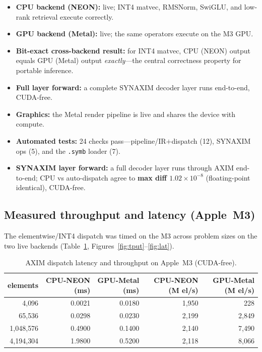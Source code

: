 \documentclass[11pt,a4paper]{article}
\begin{document}
\begin{itemize}[leftmargin=1.4em]
    \item \textbf{CPU backend (NEON):} live; INT4 matvec, RMSNorm, SwiGLU, and low-rank
    retrieval execute correctly.
    \item \textbf{GPU backend (Metal):} live; the same operators execute on the M3 GPU.
    \item \textbf{Bit-exact cross-backend result:} for INT4 matvec, CPU (NEON) output equals
    GPU (Metal) output \emph{exactly}---the central correctness property for portable
    inference.
    \item \textbf{Full layer forward:} a complete SYNAXIM decoder layer runs end-to-end,
    CUDA-free.
    \item \textbf{Graphics:} the Metal render pipeline is live and shares the device with
    compute.
    \item \textbf{Automated tests:} 24 checks pass---pipeline/IR$+$dispatch (12), SYNAXIM
    ops (5), and the \texttt{.symb} loader (7).
    \item \textbf{SYNAXIM layer forward:} a full decoder layer runs through AXIM
    end-to-end; CPU vs auto-dispatch agree to \textbf{max diff $1.02\times10^{-8}$}
    (floating-point identical), CUDA-free.
\end{itemize}

\subsection{Measured throughput and latency (Apple~M3)}

The elementwise/INT4 dispatch was timed on the M3 across problem sizes on the two live
backends (Table~\ref{tab:bench}, Figures~\ref{fig:tput}--\ref{fig:lat}).

\begin{table}[H]
\centering
\begin{tabular}{@{}rrrrr@{}}
\toprule
elements & CPU-NEON (ms) & GPU-Metal (ms) & CPU-NEON (M el/s) & GPU-Metal (M el/s) \\ \midrule
4{,}096     & 0.0021 & 0.0180 & 1{,}950 & 228 \\
65{,}536    & 0.0298 & 0.0230 & 2{,}199 & 2{,}849 \\
1{,}048{,}576 & 0.4900 & 0.1400 & 2{,}140 & 7{,}490 \\
4{,}194{,}304 & 1.9800 & 0.5200 & 2{,}118 & 8{,}066 \\ \bottomrule
\end{tabular}
\caption{AXIM dispatch latency and throughput on Apple~M3 (CUDA-free).}
\label{tab:bench}
\end{table}
\end{document}
